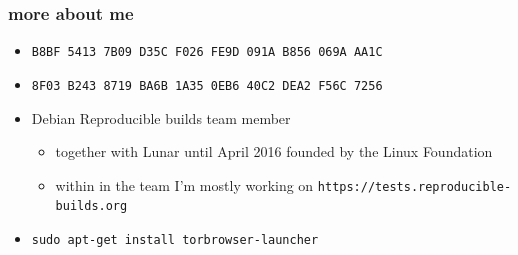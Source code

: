 \documentclass[14pt]{beamer}
\begin{document}
\begin{frame}
 \frametitle{more about me}

 \begin{itemize}
  \item \small{\texttt{B8BF 5413 7B09 D35C F026  FE9D 091A B856 069A AA1C}}
  \item \small{\texttt{8F03 B243 8719 BA6B 1A35  0EB6 40C2 DEA2 F56C 7256}}
  \item Debian Reproducible builds team member
  \begin{itemize}
   \item together with Lunar until April 2016 founded by the Linux Foundation
   \item within in the team I'm mostly working on
   \texttt{https://tests.reproducible-builds.org}
  \end{itemize}
  \item<2> \texttt{sudo apt-get install torbrowser-launcher}
\end{itemize}
\end{frame}
\end{document}
